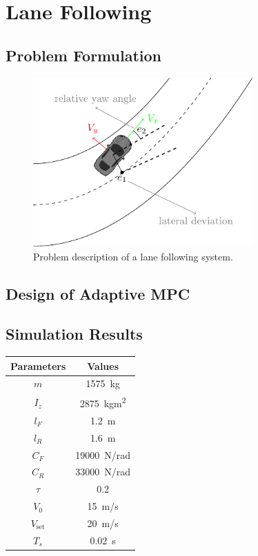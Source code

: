 \chapter{Lane Following}
\section{Problem Formulation}
\begin{figure}[!h]
	\centering
	\includegraphics[width=0.75\textwidth]{../figure/laneFollowing/laneFollowing.pdf}
	\caption{Problem description of a lane following system.}
	\label{fig:laneFollowing}
\end{figure}
\section{Design of Adaptive MPC}
\section{Simulation Results}
\begin{table}[!h]
	\centering
	\begin{tabular}{|c|c|}
		\hline
		Parameters          & Values      \\
		\hline
		$m$          & \SI{1575}{kg}              \\
		$I_z$         & \SI{2875}{kgm^2}               \\
		$l_F$           & \SI{1.2}{m}               \\
		$l_R$         & \SI{1.6}{m}               \\
		$C_F$          & \SI{19000}{\newton/rad}      \\
		$C_R$           & \SI{33000}{\newton/rad}  \\
		$\tau$             & 0.2                \\
		$V_0$           & \SI{15}{m/s}       \\
		$V_{\text{set}}$          & \SI{20}{m/s}   \\
		$T_s$         & \SI{0.02}{s}          \\
		\hline
	\end{tabular}
\end{table}

